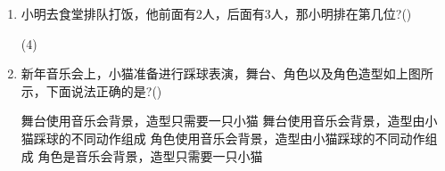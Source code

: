 \documentclass[10pt, a4paper]{article}
\begin{document}
\begin{enumerate}
        \item 小明去食堂排队打饭，他前面有2人，后面有3人，那小明排在第几位?(\qquad)
        \begin{tasks}(4)
        \end{tasks}
        
        \item 新年音乐会上，小猫准备进行踩球表演，舞台、角色以及角色造型如上图所示，下面说法正确的是?(\qquad)
        \begin{tasks}
            \task 舞台使用音乐会背景，造型只需要一只小猫
            \task 舞台使用音乐会背景，造型由小猫踩球的不同动作组成
            \task 角色使用音乐会背景，造型由小猫踩球的不同动作组成
            \task 角色是音乐会背景，造型只需要一只小猫
        \end{tasks}
    \end{enumerate}
\end{document}
